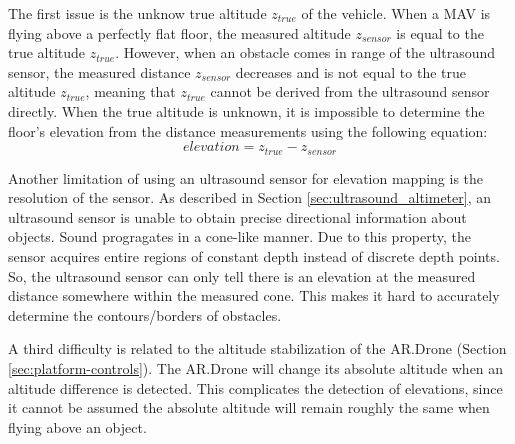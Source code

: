 The first issue is the unknow true altitude $z_{true}$ of the vehicle.
When a MAV is flying above a perfectly flat floor, the measured altitude $z_{sensor}$ is equal to the true altitude $z_{true}$.
However, when an obstacle comes in range of the ultrasound sensor, the measured distance $z_{sensor}$ decreases and is not equal to the true altitude $z_{true}$, meaning that $z_{true}$ cannot be derived from the ultrasound sensor directly.
When the true altitude is unknown, it is impossible to determine the floor's elevation from the distance measurements using the following equation:
\begin{equation}
elevation = z_{true} - z_{sensor}
\end{equation}

Another limitation of using an ultrasound sensor for elevation mapping is the resolution of the sensor.
As described in Section \ref{sec:ultrasound_altimeter}, an ultrasound sensor is unable to obtain precise directional information about objects.
Sound progragates in a cone-like manner.
Due to this property, the sensor acquires entire regions of constant depth instead of discrete depth points.
So, the ultrasound sensor can only tell there is an elevation at the measured distance somewhere within the measured cone.
This makes it hard to accurately determine the contours/borders of obstacles.

A third difficulty is related to the altitude stabilization of the AR.Drone (Section \ref{sec:platform-controls}).
The AR.Drone will change its absolute altitude when an altitude difference is detected.
This complicates the detection of elevations, since it cannot be assumed the absolute altitude will remain roughly the same when flying above an object.

